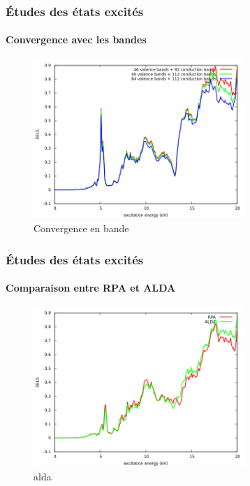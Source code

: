 \documentclass[a4paper, 12pt, twoside, titlepage, french]{beamer}
\begin{document}
\begin{frame}
\frametitle{Études des états excités}
\framesubtitle{Convergence avec les bandes}
\begin{figure}[!h]
    \centering
    \includegraphics[width=8cm]{nbd_compare}
    \caption{Convergence en bande}\label{fig-cv_nbd}
\end{figure}

\end{frame}


\begin{frame}
\frametitle{Études des états excités}
\framesubtitle{Comparaison entre RPA et ALDA}
\begin{figure}[!h]
    \centering
    \includegraphics[width=8cm]{alda_vs_rpa}
    \caption{alda}\label{fig-alda_vs_rpa}
\end{figure}

\end{frame}
\end{document}
